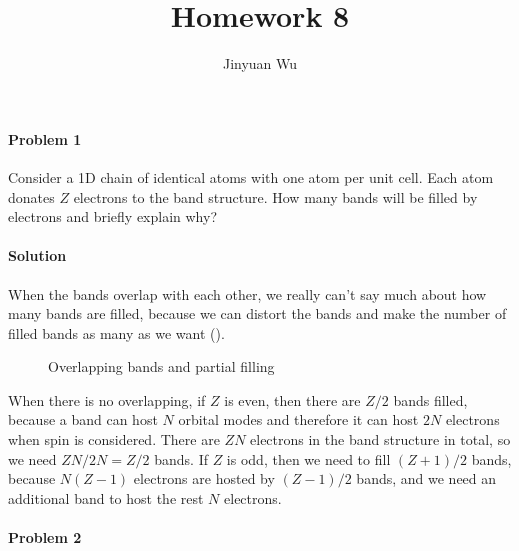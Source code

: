 \documentclass[hyperref, a4paper]{article}
\title{Homework 8}
\author{Jinyuan Wu}
\begin{document}
\maketitle

\paragraph{Problem 1} Consider a 1D chain of identical atoms with one atom per unit cell. Each atom donates $Z$ electrons to the band structure. How many bands will be filled by electrons and briefly explain why?

\paragraph{Solution} When the bands overlap with each other,
we really can't say much about how many bands are filled,
because we can distort the bands and make the number of filled bands 
as many as we want ().

\begin{figure}
    \centering
    
    \caption{Overlapping bands and partial filling}
    \label{fig:overlap}
\end{figure}

When there is no overlapping,
if $Z$ is even, then there are $Z/2$ bands filled,
because a band can host $N$ orbital modes 
and therefore it can host $2N$ electrons when spin is considered.
There are $ZN$ electrons in the band structure in total,
so we need $ZN / 2N = Z/2$ bands.
If $Z$ is odd, then we need to fill $(Z+1)/2$ bands,
because $N(Z-1)$ electrons are hosted by $(Z-1)/2$ bands,
and we need an additional band to host the rest $N$ electrons.

\paragraph{Problem 2}
\end{document}
